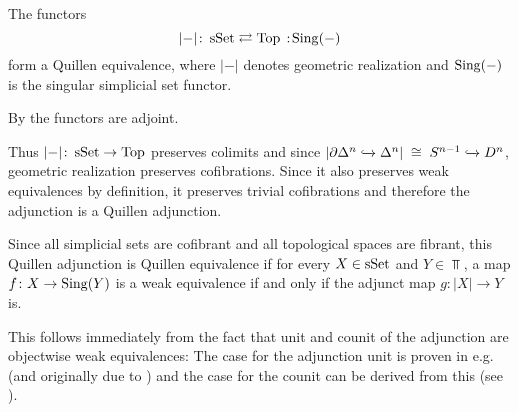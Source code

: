 \begin{thm}\label{prop:quillenEqSSetTop}
    The functors
    \begin{equation*}
        \lvert-\rvert\colon\sSet\rightleftarrows\Top\mkern+3mu:\mkern-3mu\Sing(-)
    \end{equation*}
    form a Quillen equivalence, where $\lvert-\rvert$ denotes geometric realization and $\operatorname{Sing}(-)$ is the singular simplicial set functor.
    \begin{reference} %
        By \cite[Corollary 1.1.8.5]{kerodon} the functors are adjoint.

        Thus $\lvert-\rvert\colon\operatorname{sSet}\to\operatorname{Top}$ preserves colimits and since $\lvert\partial\Delta^n\xhookrightarrow{}\Delta^n\rvert\;\cong\;S^{n-1}\xhookrightarrow{} D^n$, geometric realization preserves cofibrations.
        Since it also preserves weak equivalences by definition, it preserves trivial cofibrations and therefore the adjunction is a Quillen adjunction.

        Since all simplicial sets are cofibrant and all topological spaces are fibrant, this Quillen adjunction is Quillen equivalence if for every $X\in\operatorname{sSet}$ and $Y\in\Top$, a map $f\colon X\to\operatorname{Sing}(Y)$ is a weak equivalence if and only if the adjunct map $g\colon\lvert X\rvert\to Y$ is.
        
        This follows immediately from the fact that unit and counit of the adjunction are objectwise weak equivalences:
        The case for the adjunction unit is proven in e.g. \cite[Theorem 3.5.4.1]{kerodon} (and originally due to \cite{milnor_unit_we}) and the case for the counit can be derived from this (see \cite[Corollary 3.5.4.2]{kerodon}).
    \end{reference}
\end{thm}
